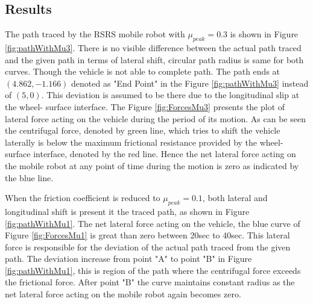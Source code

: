 {\subsection{Results}
The path traced by the RSRS mobile robot  with  $\mu_{peak} =0.3$ is shown in Figure \ref{fig:pathWithMu3}. There is no visible difference between the  actual path traced  and the given path in terms of lateral shift, circular path radius is same for both curves. Though the vehicle is not able to complete path. The path ends at ${(4.862,-1.166)}$ denoted as "End Point" in the Figure \ref{fig:pathWithMu3} instead of  ${(5,0)}$. This deviation is assumed to be there due to the longitudinal slip at the wheel- surface interface. The Figure \ref{fig:ForcesMu3} presents the plot of lateral force acting on the vehicle during the period of its motion. As can be seen the centrifugal force, denoted by green line, which tries to shift the vehicle laterally is below the maximum frictional resistance provided by the wheel-surface interface, denoted by the red line. Hence the net lateral force acting on the mobile robot at any point of time during the motion is zero as indicated by the blue line.

When the friction coefficient is reduced to  $\mu_{peak} =0.1$, both lateral and longitudinal shift is present it the traced path, as shown in Figure \ref{fig:pathWithMu1}. The  net lateral force acting on the vehicle, the blue curve of Figure \ref{fig:ForcesMu1} is great than zero between 20sec to 40sec. This lateral force is responsible for the deviation of the actual path traced from the given path. The deviation increase from point "A" to point "B" in Figure \ref{fig:pathWithMu1}, this is region of the path where the centrifugal force exceeds the frictional force. After point "B" the curve maintains constant radius as the net lateral force acting on the mobile robot again becomes zero. 
}
